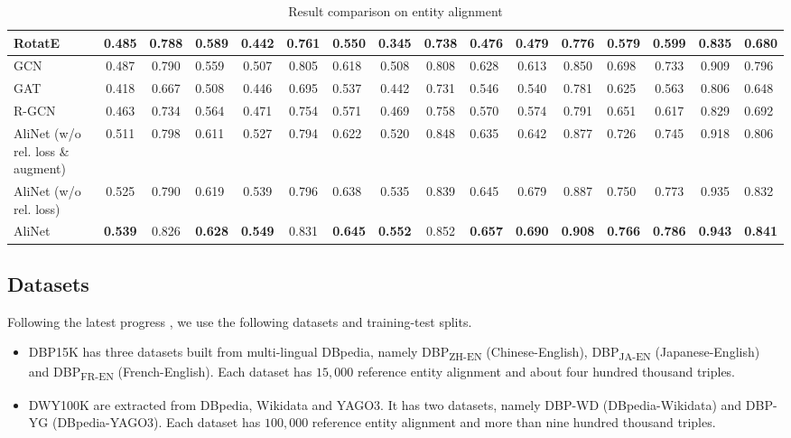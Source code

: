 \documentclass[letterpaper]{article} \usepackage{aaai20}  \usepackage{times}  \usepackage{helvet} \usepackage{courier}  \usepackage[hyphens]{url}  \usepackage{graphicx} \urlstyle{rm} \def\UrlFont{\rm}  \frenchspacing  \setlength{\pdfpagewidth}{8.5in}  \setlength{\pdfpageheight}{11in}  \usepackage{amsmath}
\begin{document}
\begin{table*}[!t]
{\begin{tabular}{lcclcclcclcclccl}
				RotatE \cite{RotatE} & 0.485 & 0.788 & 0.589 & 0.442 & 0.761 & 0.550 & 0.345 & 0.738 & 0.476 & 0.479 & 0.776 & 0.579 & 0.599 & 0.835 & 0.680\\
				\midrule
				GCN \cite{GCN} & 0.487 & 0.790 & 0.559 & 0.507 & 0.805 & 0.618 & 0.508 & 0.808 & 0.628 & 0.613 & 0.850 & 0.698 & 0.733 & 0.909 & 0.796\\
				GAT \cite{GAT} & 0.418 & 0.667 & 0.508 & 0.446 & 0.695 & 0.537 & 0.442 & 0.731 & 0.546 & 0.540 & 0.781 & 0.625 & 0.563 & 0.806 & 0.648 \\
				R-GCN \cite{R-GCN} & 0.463 & 0.734 & 0.564 & 0.471 & 0.754 & 0.571 & 0.469 & 0.758 & 0.570 & 0.574 & 0.791 & 0.651 & 0.617 & 0.829 & 0.692\\
				\midrule
				AliNet (w/o rel. loss \& augment) & 0.511 & 0.798 & 0.611 & 0.527 & 0.794 & 0.622 & 0.520 & 0.848 & 0.635 & 0.642 & 0.877 & 0.726 & 0.745 & 0.918 & 0.806\\
				AliNet (w/o rel. loss) & 0.525 & 0.790 & 0.619 & 0.539 & 0.796 & 0.638 & 0.535 & 0.839 & 0.645 & 0.679 & 0.887 & 0.750 & 0.773 & 0.935 & 0.832\\
								AliNet & \textbf{0.539} & 0.826 & \textbf{0.628} & \textbf{0.549} & 0.831 & \textbf{0.645} & \textbf{0.552} & 0.852 & \textbf{0.657} & \textbf{0.690} & \textbf{0.908} & \textbf{0.766} & \textbf{0.786} & \textbf{0.943} & \textbf{0.841}\\
				\bottomrule
			\end{tabular}}
			\caption{Result comparison on entity alignment}
	\label{tab:ent_alignment}
\end{table*}

\subsection{Datasets}
Following the latest progress \cite{BootEA,MuGNN}, we use the following datasets and training-test splits.
\begin{itemize} 
	\item DBP15K \cite{JAPE} has three datasets built from multi-lingual DBpedia, namely DBP\textsubscript{ZH-EN} (Chinese-English), DBP\textsubscript{JA-EN} (Japanese-English) and DBP\textsubscript{FR-EN} (French-English). Each dataset has $15,000$ reference entity alignment and about four hundred thousand triples.
	\item DWY100K \cite{BootEA} are extracted from DBpedia, Wikidata and YAGO3. It has two datasets, namely DBP-WD (DBpedia-Wikidata) and DBP-YG (DBpedia-YAGO3). Each dataset has $100,000$ reference entity alignment and more than nine hundred thousand triples.
\end{itemize}  
\end{document}

